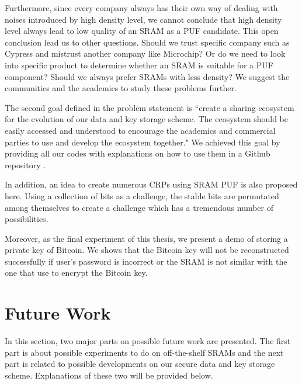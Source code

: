 Furthermore, since every company always has their own way of dealing with noises introduced by high density level, we cannot conclude that high density level always lead to low quality of an SRAM as a PUF candidate. This open conclusion lead us to other questions. Should we trust specific company such as Cypress and mistrust another company like Microchip? Or do we need to look into specific product to determine whether an SRAM is suitable for a PUF component? Should we always prefer SRAMs with less density? We suggest the communities and the academics to study these problems further.

The second goal defined in the problem statement is ``create a sharing ecosystem for the evolution of our data and key storage scheme. The ecosystem should be easily accessed and understood to encourage the academics and commercial parties to use and develop the ecosystem together." We achieved this goal by providing all our codes with explanations on how to use them in a Github repository \cite{repository}.

In addition, an idea to create numerous CRPs using SRAM PUF is also proposed here. Using a collection of bits as a challenge, the stable bits are permutated among themselves to create a challenge which has a tremendous number of possibilities.


Moreover, as the final experiment of this thesis, we present a demo of storing a private key of Bitcoin.
We shows that the Bitcoin key will not be reconstructed successfully if user's password is incorrect or the SRAM is not similar with the one that use to encrypt the Bitcoin key.


\section{Future Work}

In this section, two major parts on possible future work are presented. The first part is about possible experiments to do on off-the-shelf SRAMs and the next part is related to possible developments on our secure data and key storage scheme. Explanations of these two will be provided below.

